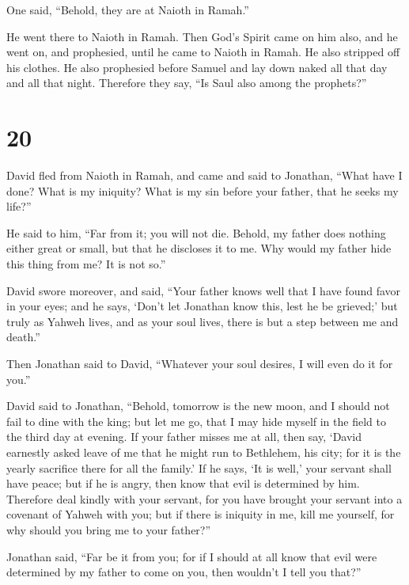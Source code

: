 One said, ``Behold, they are at Naioth in Ramah.''

 He went there to Naioth in Ramah. Then God's Spirit came
on him also, and he went on, and prophesied, until he came to Naioth in
Ramah.  He also stripped off his clothes. He also
prophesied before Samuel and lay down naked all that day and all that
night. Therefore they say, ``Is Saul also among the prophets?''

\hypertarget{section-19}{%
\section{20}\label{section-19}}

 David fled from Naioth in Ramah, and came and said to
Jonathan, ``What have I done? What is my iniquity? What is my sin before
your father, that he seeks my life?''

 He said to him, ``Far from it; you will not die. Behold,
my father does nothing either great or small, but that he discloses it
to me. Why would my father hide this thing from me? It is not so.''

 David swore moreover, and said, ``Your father knows well
that I have found favor in your eyes; and he says, `Don't let Jonathan
know this, lest he be grieved;' but truly as Yahweh lives, and as your
soul lives, there is but a step between me and death.''

 Then Jonathan said to David, ``Whatever your soul
desires, I will even do it for you.''

 David said to Jonathan, ``Behold, tomorrow is the new
moon, and I should not fail to dine with the king; but let me go, that I
may hide myself in the field to the third day at evening. 
If your father misses me at all, then say, `David earnestly asked leave
of me that he might run to Bethlehem, his city; for it is the yearly
sacrifice there for all the family.'  If he says, `It is
well,' your servant shall have peace; but if he is angry, then know that
evil is determined by him.  Therefore deal kindly with
your servant, for you have brought your servant into a covenant of
Yahweh with you; but if there is iniquity in me, kill me yourself, for
why should you bring me to your father?''

 Jonathan said, ``Far be it from you; for if I should at
all know that evil were determined by my father to come on you, then
wouldn't I tell you that?''

